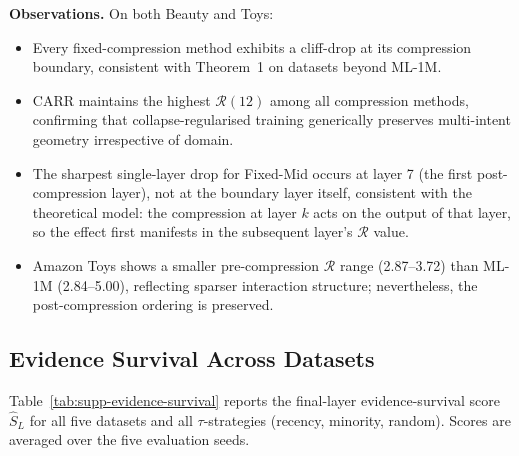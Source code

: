 \documentclass[letterpaper,10pt]{article}
\begin{document}
\noindent\textbf{Observations.} On both Beauty and Toys:
\begin{itemize}
  \item Every fixed-compression method exhibits a cliff-drop at its compression boundary, consistent with Theorem~1 on datasets beyond ML-1M.
  \item CARR maintains the highest $\mathcal{R}(12)$ among all compression methods, confirming that collapse-regularised training generically preserves multi-intent geometry irrespective of domain.
  \item The sharpest single-layer drop for Fixed-Mid occurs at layer 7 (the first post-compression layer), not at the boundary layer itself, consistent with the theoretical model: the compression at layer $k$ acts on the output of that layer, so the effect first manifests in the subsequent layer's $\mathcal{R}$ value.
  \item Amazon Toys shows a smaller pre-compression $\mathcal{R}$ range (2.87--3.72) than ML-1M (2.84--5.00), reflecting sparser interaction structure; nevertheless, the post-compression ordering is preserved.
\end{itemize}

\subsection{Evidence Survival Across Datasets}

Table~\ref{tab:supp-evidence-survival} reports the final-layer evidence-survival score $\widehat{S}_L$ for all five datasets and all $\tau$-strategies (recency, minority, random). Scores are averaged over the five evaluation seeds.

\begin{table}[h!]
\centering
\caption{Evidence-Survival Score $\widehat{S}_L$ Across Datasets and $\tau$-Strategies\label{tab:supp-evidence-survival}}
\end{table}
\end{document}
